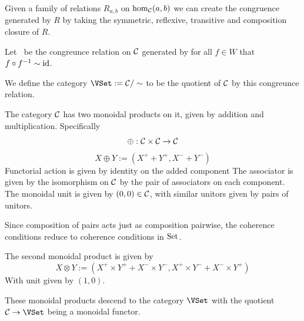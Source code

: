 \documentclass{article}
\begin{document}
Given a family of relations $R_{a, b}$ on $\hom_{\mathcal{C}}(a, b)$ we can create the congruence generated by $R$ by taking the symmetric, reflexive, transitive and composition closure of $R$.

Let $~$ be the congreunce relation on $\mathcal{C}$ generated by for all $f \in W$ that $f \circ f^{-1} \sim \mathrm{id}$. 

We define the category $\VSet := \cC / \sim$ to be the quotient of $\mathcal{C}$ by this congreunce relation.

\begin{definition}
    The category $\mathcal{C}$ has two monoidal products on it, given by addition and multiplication.
    Specifically
    \[ \oplus : \mathcal{C} \times \mathcal{C} \to \mathcal{C} \]
    \[ X \oplus Y := (X^+ + Y^+, X^- + Y^-) \]
    Functorial action is given by identity on the added component
    The associator is given by the isomorphism on $\mathcal{C}$ by the pair of associators on each component.
    The monoidal unit is given by $(0, 0) \in \mathcal{C}$, with similar unitors given by pairs of unitors.

    Since composition of pairs acts just as composition pairwise, the coherence conditions reduce to coherence conditions in $\mathrm{Set}$.
    
    The second monoidal product is given by 
    \[ X \otimes Y := (X^+ \times Y^+ + X^- \times Y^-, X^+ \times Y^- + X^- \times Y^+)\]
    With unit given by $(1, 0)$.
\end{definition}

\begin{theorem}
  These monoidal products descend to the category $\VSet$ with the quotient $\cC \to \VSet$ being a monoidal functor.
\end{theorem}
\end{document}
